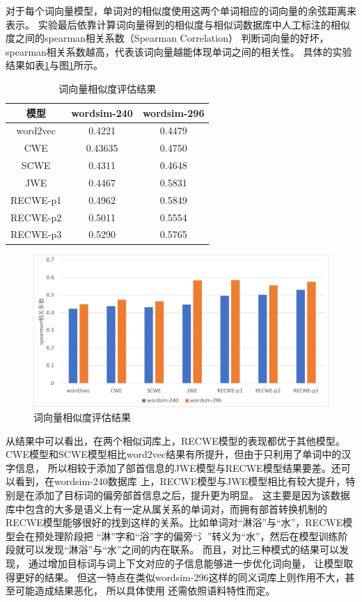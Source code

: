\documentclass{standalone}
\begin{document}
对于每个词向量模型，单词对的相似度使用这两个单词相应的词向量的余弦距离来表示。
实验最后依靠计算词向量得到的相似度与相似词数据库中人工标注的相似度之间的spearman相关系数（Spearman Correlation）
判断词向量的好坏，spearman相关系数越高，代表该词向量越能体现单词之间的相关性。
具体的实验结果如表\ref{word_vec_result}与图\ref{word_vec_result_pic}所示。
\begin{table}[ht]
    \caption{词向量相似度评估结果}
    \begin{tabular}{|c|c|c|}
        \hline
        模型 & wordsim-240 & wordsim-296 \\
        \hline
        word2vec & 0.4221 & 0.4479 \\
        \hline
        CWE & 0.43635 & 0.4750 \\
        \hline
        SCWE & 0.4311 & 0.4648 \\
        \hline
        JWE & 0.4467 & 0.5831 \\
        \hline
        RECWE-p1 & 0.4962 & 0.5849 \\
        \hline
        RECWE-p2 & 0.5011 & 0.5554 \\
        \hline
        RECWE-p3 & 0.5290 & 0.5765 \\
        \hline
    \end{tabular}
    \label{word_vec_result}
    \end{table}
    \begin{figure}[!h]
        \includegraphics[scale=0.45]{picture/word_sim.pdf}
        \caption{词向量相似度评估结果}
        \label{word_vec_result_pic}
    \end{figure}

从结果中可以看出，在两个相似词库上，RECWE模型的表现都优于其他模型。
CWE模型和SCWE模型相比word2vec结果有所提升，但由于只利用了单词中的汉字信息，
所以相较于添加了部首信息的JWE模型与RECWE模型结果要差。还可以看到，在wordsim-240数据库
上，RECWE模型与JWE模型相比有较大提升，特别是在添加了目标词的偏旁部首信息之后，提升更为明显。
这主要是因为该数据库中包含的大多是语义上有一定从属关系的单词对，而拥有部首转换机制的
RECWE模型能够很好的找到这样的关系。比如单词对“淋浴”与“水”，RECWE模型会在预处理阶段把
“淋”字和“浴”字的偏旁“氵”转义为“水”，然后在模型训练阶段就可以发现“淋浴”与“水”之间的内在联系。
而且，对比三种模式的结果可以发现，
通过增加目标词与词上下文对应的子信息能够进一步优化词向量，
让模型取得更好的结果。
但这一特点在类似wordsim-296这样的同义词库上则作用不大，甚至可能造成结果恶化，
所以具体使用
还需依照语料特性而定。
\end{document}
